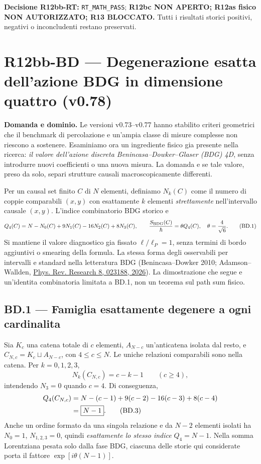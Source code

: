 \documentclass[11pt,a4paper]{article}
\begin{document}
\textbf{Decisione R12bb-RT:} \texttt{RT\_MATH\_PASS}; \textbf{R12bc NON APERTO; R12as fisico NON AUTORIZZATO; R13 BLOCCATO.}
Tutti i risultati storici positivi, negativi o inconcludenti restano preservati.

\clearpage
\section*{R12bb-BD --- Degenerazione esatta dell'azione BDG in dimensione quattro (v0.78)}
\textbf{Domanda e dominio.} Le versioni v0.73--v0.77 hanno stabilito criteri geometrici che il benchmark di percolazione e un'ampia classe di misure complesse non riescono a sostenere. Esaminiamo ora un ingrediente fisico gia presente nella ricerca: \emph{il valore dell'azione discreta Benincasa--Dowker--Glaser (BDG) 4D}, senza introdurre nuovi coefficienti o una nuova misura. La domanda e se tale valore, preso da solo, separi strutture causali macroscopicamente differenti.

Per un causal set finito $C$ di $N$ elementi, definiamo $N_k(C)$ come il numero di coppie comparabili $(x,y)$ con esattamente $k$ elementi \emph{strettamente} nell'intervallo causale $(x,y)$. L'indice combinatorio BDG storico e
\begin{equation}
 Q_4(C)=N-N_0(C)+9N_1(C)-16N_2(C)+8N_3(C),\qquad
 \frac{S_{\rm BDG}(C)}{\hbar}=\theta Q_4(C),\quad\theta=\frac4{\sqrt6}.
 \tag{BD.1}
\end{equation}
Si mantiene il valore diagnostico gia fissato $\ell/\ell_P=1$, senza termini di bordo aggiuntivi o smearing della formula. La stessa forma degli osservabili per intervalli e standard nella letteratura BDG (Benincasa--Dowker 2010; Adamson--Wallden, \href{https://doi.org/10.1103/qdst-yrh6}{Phys. Rev. Research 8, 023188, 2026}). La dimostrazione che segue e un'identita combinatoria limitata a BD.1, non un teorema sul path sum fisico.

\subsection*{BD.1 --- Famiglia esattamente degenere a ogni cardinalita}
Sia $K_c$ una catena totale di $c$ elementi, $A_{N-c}$ un'anticatena isolata dal resto, e $C_{N,c}=K_c\sqcup A_{N-c}$, con $4\le c\le N$. Le uniche relazioni comparabili sono nella catena. Per $k=0,1,2,3$,
\begin{equation}
 N_k(C_{N,c})=c-k-1\qquad(c\ge4),
 \tag{BD.2}
\end{equation}
intendendo $N_3=0$ quando $c=4$. Di conseguenza,
\begin{align}
 Q_4(C_{N,c})&=N-(c-1)+9(c-2)-16(c-3)+8(c-4)\notag\\
 &=\boxed{N-1}.\tag{BD.3}
\end{align}
Anche un ordine formato da una singola relazione e da $N-2$ elementi isolati ha $N_0=1$, $N_{1,2,3}=0$, quindi \emph{esattamente lo stesso indice} $Q_4=N-1$. Nella somma Lorentziana pesata solo dalla fase BDG, ciascuna delle storie qui considerate porta il fattore $\exp[i\theta(N-1)]$.
\end{document}
